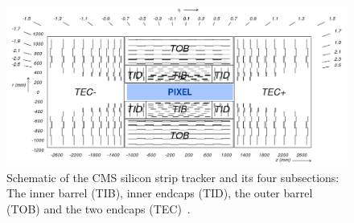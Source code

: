 \begin{figure}[h] 
    \centering
    \includegraphics[width=1.0\textwidth]{figures/cms/fig_cmstracker.png}
    \caption{Schematic of the CMS silicon strip tracker and its four subsections: The inner barrel (TIB), inner endcaps (TID), the outer barrel (TOB) and the two endcaps (TEC)~\cite{Chatrchyan:2008aa}.}
    \label{fig:cms:tracker}
\end{figure}

